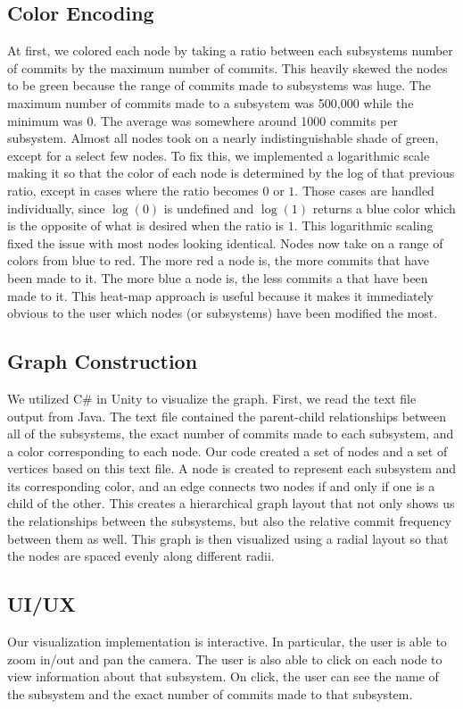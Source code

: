 \documentclass[conference]{IEEEtran}
\begin{document}
\subsection{Color Encoding}
At first, we colored each node by taking a ratio between each subsystems number of commits by the maximum number of commits. This heavily skewed the nodes to be green because the range of commits made to subsystems was huge. The maximum number of commits made to a subsystem was 500,000 while the minimum was 0. The average was somewhere around 1000 commits per subsystem. Almost all nodes took on a nearly indistinguishable shade of green, except for a select few nodes. To fix this, we implemented a logarithmic scale making it so that the color of each node is  determined by the log of that previous ratio, except in cases where the ratio becomes $0$ or $1$. Those cases are handled individually, since $\log(0)$ is undefined and $\log(1)$ returns a blue color which is the opposite of what is desired when the ratio is $1$. This logarithmic scaling fixed the issue with most nodes looking identical. Nodes now take on a range of colors from blue to red. The more red a node is, the more commits that have been made to it. The more blue a node is, the less commits a that have been made to it. This heat-map approach is useful because it makes it immediately obvious to the user which nodes (or subsystems) have been modified the most.

\subsection{Graph Construction}
We utilized C\# in Unity to visualize the graph. First, we read the text file output from Java. The text file contained the parent-child relationships between all of the subsystems, the exact number of commits made to each subsystem, and a color corresponding to each node. Our code created a set of nodes and a set of vertices based on this text file. A node is created to represent each subsystem and its corresponding color, and an edge connects two nodes if and only if one is a child of the other. This creates a hierarchical graph layout that not only shows us the relationships between the subsystems, but also the relative commit frequency between them as well. This graph is then visualized using a radial layout so that the nodes are spaced evenly along different radii.

\subsection{UI/UX}
Our visualization implementation is interactive. In particular, the user is able to zoom in/out and pan the camera. The user is also able to click on each node to view information about that subsystem. On click, the user can see the name of the subsystem and the exact number of commits made to that subsystem. 
\end{document}
